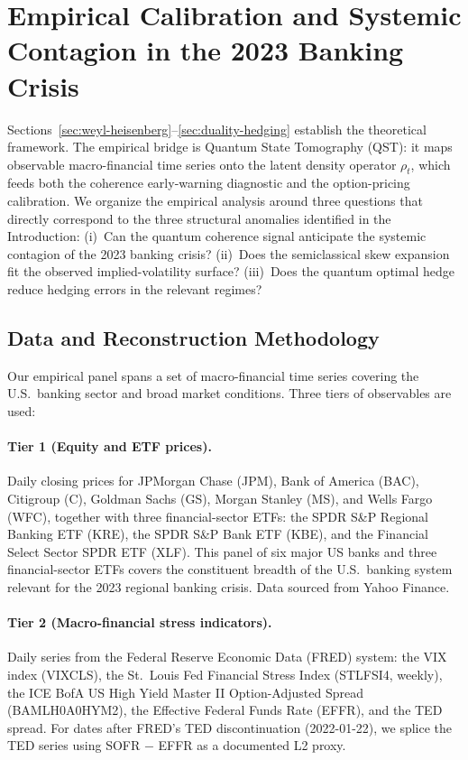﻿%

\section{Empirical Calibration and Systemic Contagion in the 2023 Banking Crisis}
\label{sec:empirical-calibration}

Sections~\ref{sec:weyl-heisenberg}--\ref{sec:duality-hedging} establish the
theoretical framework. The empirical bridge is Quantum State Tomography (QST):
it maps observable macro-financial time series onto the latent density operator
$\rho_t$, which feeds both the coherence early-warning diagnostic and the
option-pricing calibration. We organize the empirical analysis around three
questions that directly correspond to the three structural anomalies identified
in the Introduction: (i)~Can the quantum coherence signal anticipate the
systemic contagion of the 2023 banking crisis? (ii)~Does the semiclassical
skew expansion fit the observed implied-volatility surface? (iii)~Does the
quantum optimal hedge reduce hedging errors in the relevant regimes?

\subsection{Data and Reconstruction Methodology}\label{sec:data-methodology}

Our empirical panel spans a set of macro-financial time series covering the U.S.\
banking sector and broad market conditions. Three tiers of observables are used:

\paragraph{Tier 1 (Equity and ETF prices).}
Daily closing prices for JPMorgan Chase (JPM), Bank of America (BAC), Citigroup (C),
Goldman Sachs (GS), Morgan Stanley (MS), and Wells Fargo (WFC), together with three
financial-sector ETFs: the SPDR S\&P Regional Banking ETF (KRE), the SPDR S\&P Bank
ETF (KBE), and the Financial Select Sector SPDR ETF (XLF). This panel of six major
US banks and three financial-sector ETFs covers the constituent breadth of the U.S.\
banking system relevant for the 2023 regional banking crisis. Data sourced from
Yahoo Finance.

\paragraph{Tier 2 (Macro-financial stress indicators).}
Daily series from the Federal Reserve Economic Data (FRED) system: the VIX index
(VIXCLS), the St.~Louis Fed Financial Stress Index (STLFSI4, weekly), the ICE BofA
US High Yield Master II Option-Adjusted Spread (BAMLH0A0HYM2), the Effective Federal
Funds Rate (EFFR), and the TED spread. For dates after FRED's TED discontinuation
(2022-01-22), we splice the TED series using SOFR $-$ EFFR as a documented L2 proxy.

